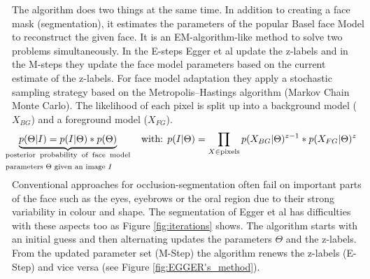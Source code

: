 \pagebreak

The algorithm does two things at the same time. In addition to creating a face mask (segmentation), it estimates the parameters of the popular Basel face Model to reconstruct the given face. It is an EM-algorithm-like method to solve two problems simultaneously. In the E-steps Egger et al update the z-labels and in the M-steps they update the face model  parameters based on the current estimate of the z-labels. For face model adaptation they apply a stochastic sampling strategy based on the Metropolis–Hastings algorithm (Markov Chain Monte Carlo). The likelihood of each pixel is split up into a background model ($X_{BG}$) and a foreground model ($X_{FG}$).
\[ 
\underbrace{p(\Theta |I)=p(I| \Theta)*p(\Theta)}_{\mathclap{\text{\parbox{4.5cm}{posterior probability of face model parameters $\Theta$ given an image $I$}}}}\quad\quad\text{ with: }p(I|\Theta)=\prod_{X \in \text{pixels}}p(X_{BG}|\Theta)^{z-1}*p(X_{FG}|\Theta)^z
\]
Conventional approaches for occlusion-segmentation often fail on important parts of the face such as the eyes, eyebrows or the oral region due to their strong variability in colour and shape. The segmentation of Egger et al has difficulties with these aspects too as Figure \ref{fig:iterations} shows. The algorithm starts with an initial guess and then alternating updates the parameters $\Theta$ and the z-labels. From the updated parameter set (M-Step) the algorithm renews the z-labels (E-Step) and vice versa (see Figure \ref{fig:EGGER's_method}).\\

